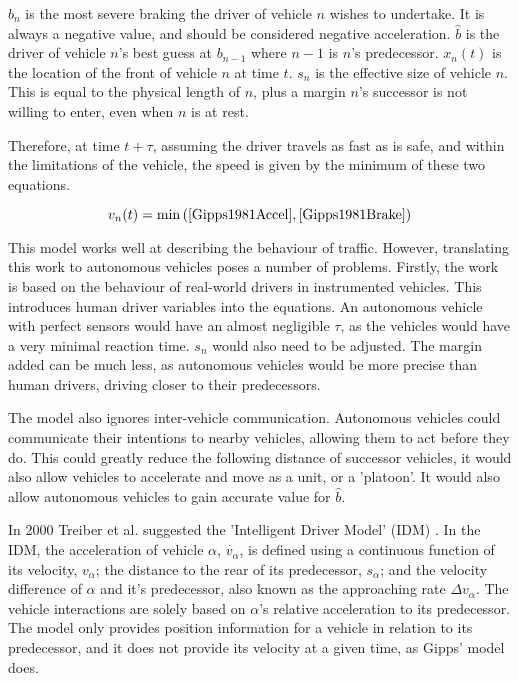 $b_n$ is the most severe braking the driver of vehicle $n$ wishes to undertake. It is always a negative value, and should be considered negative acceleration. $\hat{b}$ is the driver of vehicle $n$'s best guess at $b_{n-1}$ where $n-1$ is $n$'s predecessor. $x_n(t)$ is the location of the front of vehicle $n$ at time $t$. $s_n$ is the effective size of vehicle $n$. This is equal to the physical length of $n$, plus a margin $n$'s successor is not willing to enter, even when $n$ is at rest.

Therefore, at time $t + \tau$, assuming the driver travels as fast as is safe, and within the limitations of the vehicle, the speed is given by the minimum of these two equations.

\begin{equation}
v_n(t) = \min{(\eqref{Gipps1981Accel},\eqref{Gipps1981Brake})}
\end{equation}

This model works well at describing the behaviour of traffic. However, translating this work to autonomous vehicles poses a number of problems. Firstly, the work is based on the behaviour of real-world drivers in instrumented vehicles. This introduces human driver variables into the equations. An autonomous vehicle with perfect sensors would have an almost negligible $\tau$, as the vehicles would have a very minimal reaction time. $s_n$ would also need to be adjusted. The margin added can be much less, as autonomous vehicles would be more precise than human drivers, driving closer to their predecessors. 

The model also ignores inter-vehicle communication. Autonomous vehicles could communicate their intentions to nearby vehicles, allowing them to act before they do. This could greatly reduce the following distance of successor vehicles, it would also allow vehicles to accelerate and move as a unit, or a 'platoon'. It would also allow autonomous vehicles to gain accurate value for $\hat{b}$.

In 2000 Treiber et al. suggested the 'Intelligent Driver Model' (IDM) \citep{Treiber2000}. In the IDM, the acceleration of vehicle $\alpha$, $\dot{v_\alpha}$, is defined using a continuous function of its velocity, $v_\alpha$; the distance to the rear of its predecessor, $s_\alpha$; and the velocity difference of $\alpha$ and it's predecessor, also known as the approaching rate $\Delta v_\alpha$. The vehicle interactions are solely based on $\alpha$'s relative acceleration to its predecessor. The model only provides position information for a vehicle in relation to its predecessor, and it does not provide its velocity at a given time, as Gipps' model does. 

